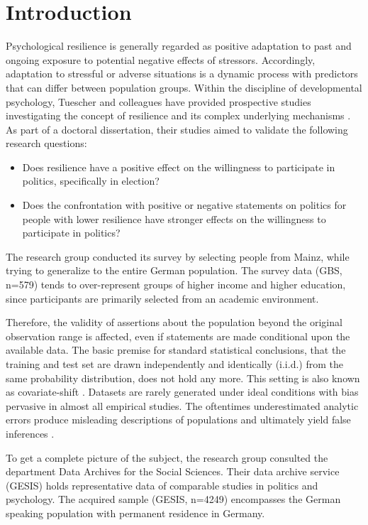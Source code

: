 \chapter{Introduction}

Psychological resilience is generally regarded as positive adaptation to past and ongoing exposure to potential negative effects of stressors. Accordingly, adaptation to stressful or adverse situations is a dynamic process with predictors that can differ between population groups. Within the discipline of developmental psychology, Tuescher and colleagues have provided prospective studies investigating the concept of resilience and its complex underlying mechanisms \cite{tuscher}. As part of a doctoral dissertation, their studies aimed to validate the following research questions:

\begin{itemize}
    \item Does resilience have a positive effect on the willingness to participate in politics, specifically in election?
    \item  Does the confrontation with positive or negative statements on politics for people with lower resilience have stronger effects on the willingness to participate in politics?
\end{itemize}

The research group conducted its survey by selecting people from Mainz, while trying to generalize to the entire German population. The survey data (GBS, n=579) tends to over-represent groups of higher income and higher education, since participants are primarily selected from an academic environment.

Therefore, the validity of assertions about the population beyond the original observation range is affected, even if statements are made conditional upon the available data. The basic premise for standard statistical conclusions, that the training and test set are drawn independently and identically (i.i.d.) from the same probability distribution, does not hold any more. This setting is also known as covariate-shift \cite{candela}. Datasets are rarely generated under ideal conditions with bias pervasive in almost all empirical studies. The oftentimes underestimated analytic errors produce misleading descriptions of populations and ultimately yield false inferences \cite{west}.

To get a complete picture of the subject, the research group consulted the department Data Archives for the Social Sciences. Their data archive service (GESIS) holds representative data of comparable studies in politics and psychology. The acquired sample (GESIS, n=4249) encompasses the German speaking population with permanent residence in Germany. 

